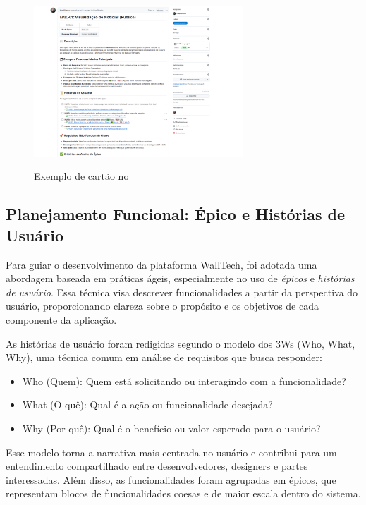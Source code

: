 \begin{figure}[H]
  \centering
  \caption{Exemplo de cartão  no }
  \includegraphics[width=0.7\textwidth]{media/wall_tech_epic.png}
  \label{fig:kanban-userstories}
\end{figure}




\subsection{Planejamento Funcional: Épico e Histórias de Usuário}

Para guiar o desenvolvimento da plataforma WallTech, foi adotada uma abordagem baseada em práticas ágeis, especialmente no uso de \textit{épicos} e \textit{histórias de usuário}. Essa técnica visa descrever funcionalidades a partir da perspectiva do usuário, proporcionando clareza sobre o propósito e os objetivos de cada componente da aplicação.

As histórias de usuário foram redigidas segundo o modelo dos 3Ws (Who, What, Why), uma técnica comum em análise de requisitos que busca responder:
\begin{itemize}
  \item Who (Quem): Quem está solicitando ou interagindo com a funcionalidade?
  \item What (O quê): Qual é a ação ou funcionalidade desejada?
  \item Why (Por quê): Qual é o benefício ou valor esperado para o usuário?
\end{itemize}

Esse modelo torna a narrativa mais centrada no usuário e contribui para um entendimento compartilhado entre desenvolvedores, designers e partes interessadas. Além disso, as funcionalidades foram agrupadas em épicos, que representam blocos de funcionalidades coesas e de maior escala dentro do sistema.

